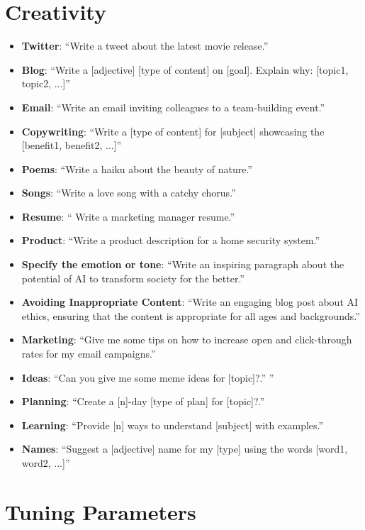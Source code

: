 \section{Creativity}
\begin{itemize}
\itemsep-0.25em %
\item \textbf{Twitter}: ``Write a tweet about the latest movie release.''
\item \textbf{Blog}: ``Write a [adjective] [type of content] on [goal]. Explain
why: [topic1, topic2, ...]''
\item \textbf{Email}: ``Write an email inviting colleagues to a team-building event.''
\item \textbf{Copywriting}: ``Write a [type of content] for [subject] showcasing the [benefit1, benefit2, ...]''

\item \textbf{Poems}: ``Write a haiku about the beauty of nature.''
\item \textbf{Songs}: ``Write a love song with a catchy chorus.''
\item \textbf{Resume}: `` Write a marketing manager resume.''
\item \textbf{Product}: ``Write a product description for a home security system.''
\item \textbf{Specify the emotion or tone}: ``Write an inspiring paragraph about the potential of AI to transform society for the better.''
\item \textbf{Avoiding Inappropriate Content}: ``Write an engaging blog post about AI ethics, ensuring that the content is appropriate for all ages and backgrounds.''
\item \textbf{Marketing}: ``Give me some tips on how to increase open and click-through rates for my email campaigns.''
\item \textbf{Ideas}: ``Can you give me some meme ideas for [topic]?.''
''
\item \textbf{Planning}: ``Create a [n]-day [type of plan] for [topic]?.''
\item \textbf{Learning}: ``Provide [n] ways to understand [subject] with examples.''
\item \textbf{Names}: ``Suggest a [adjective] name for my [type] using the words [word1, word2, ...]''
\end{itemize}

\section{Tuning Parameters}

